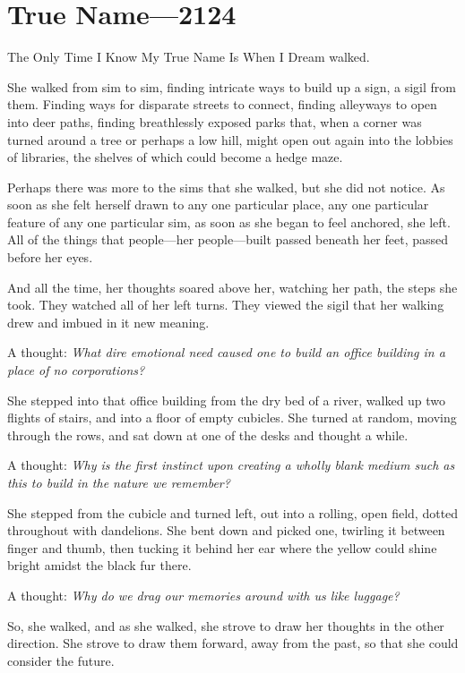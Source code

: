 \hypertarget{true-name-2124}{%
\chapter{True Name—2124}\label{true-name-2124}}

The Only Time I Know My True Name Is When I Dream walked.

She walked from sim to sim, finding intricate ways to build up a sign, a sigil from them. Finding ways for disparate streets to connect, finding alleyways to open into deer paths, finding breathlessly exposed parks that, when a corner was turned around a tree or perhaps a low hill, might open out again into the lobbies of libraries, the shelves of which could become a hedge maze.

Perhaps there was more to the sims that she walked, but she did not notice. As soon as she felt herself drawn to any one particular place, any one particular feature of any one particular sim, as soon as she began to feel anchored, she left. All of the things that people---her people---built passed beneath her feet, passed before her eyes.

And all the time, her thoughts soared above her, watching her path, the steps she took. They watched all of her left turns. They viewed the sigil that her walking drew and imbued in it new meaning.

A thought: \emph{What dire emotional need caused one to build an office building in a place of no corporations?}

She stepped into that office building from the dry bed of a river, walked up two flights of stairs, and into a floor of empty cubicles. She turned at random, moving through the rows, and sat down at one of the desks and thought a while.

A thought: \emph{Why is the first instinct upon creating a wholly blank medium such as this to build in the nature we remember?}

She stepped from the cubicle and turned left, out into a rolling, open field, dotted throughout with dandelions. She bent down and picked one, twirling it between finger and thumb, then tucking it behind her ear where the yellow could shine bright amidst the black fur there.

A thought: \emph{Why do we drag our memories around with us like luggage?}

So, she walked, and as she walked, she strove to draw her thoughts in the other direction. She strove to draw them forward, away from the past, so that she could consider the future.

